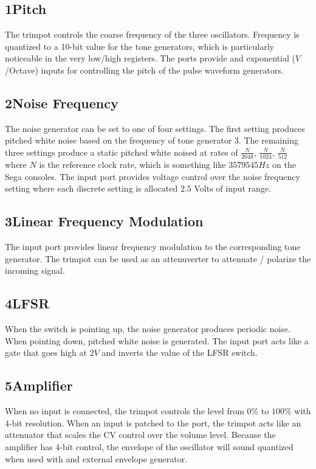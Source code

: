 \documentclass[12pt,letter]{article}
\begin{document}
\subsection*{1{\quad}Pitch}

The trimpot controls the coarse frequency of the three oscillators. Frequency
is quantized to a 10-bit value for the tone generators, which is particularly
noticeable in the very low/high registers. The ports provide and exponential
($V$/Octave) inputs for controlling the pitch of the pulse waveform
generators.

\subsection*{2{\quad}Noise Frequency}

The noise generator can be set to one of four settings. The first setting
produces pitched white noise based on the frequency of tone generator 3. The
remaining three settings produce a static pitched white noised at rates of
$\frac{N}{2048}$, $\frac{N}{1024}$, $\frac{N}{512}$ where $N$ is the reference
clock rate, which is something like $3579545Hz$ on the Sega consoles. The input
port provides voltage control over the noise frequency setting where each
discrete setting is allocated $2.5$ Volts of input range.

\subsection*{3{\quad}Linear Frequency Modulation}

The input port provides linear frequency modulation to the corresponding tone
generator. The trimpot can be used as an attenuverter to attenuate / polarize
the incoming signal.

\subsection*{4{\quad}LFSR}

When the switch is pointing up, the noise generator produces periodic noise.
When pointing down, pitched white noise is generated. The input port acts like
a gate that goes high at $2V$ and inverts the value of the LFSR switch.

\subsection*{5{\quad}Amplifier}

When no input is connected, the trimpot controls the level from $0\%$ to
$100\%$ with 4-bit resolution. When an input is patched to the port, the
trimpot acts like an attenuator that scales the CV control over the volume
level. Because the amplifier has 4-bit control, the envelope of the oscillator
will sound quantized when used with and external envelope generator.
\end{document}
